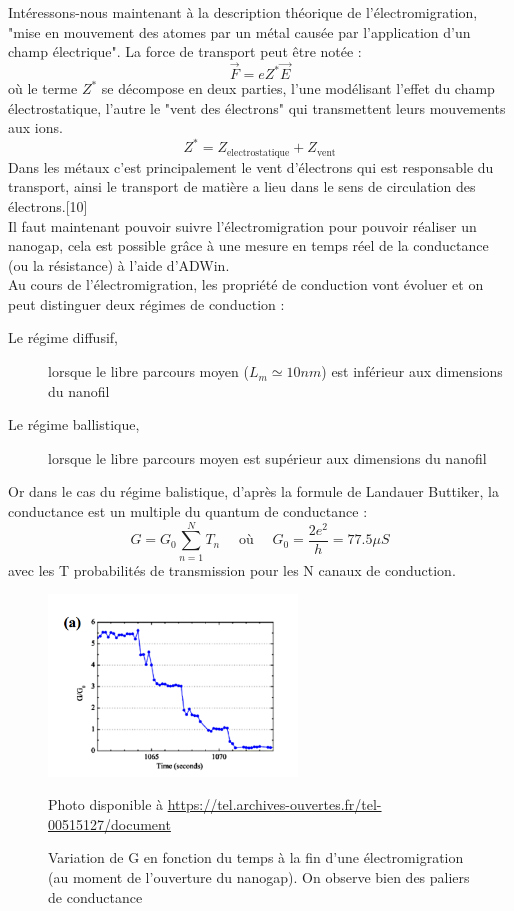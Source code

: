 Intéressons-nous maintenant à la description théorique de l'électromigration, "mise en mouvement des atomes par un métal causée par l'application d'un champ électrique". La force de transport peut être notée :
\[\vec{F}=e Z^* \vec{E}\]
où le terme $Z^*$ se décompose en deux parties, l'une modélisant l'effet du champ électrostatique, l'autre le "vent des électrons" qui transmettent leurs mouvements aux ions.
\[Z^* = Z_{\text{electrostatique}} + Z_{\text{vent}}\]
Dans les métaux c'est principalement le vent d'électrons qui est responsable du transport, ainsi le transport de matière a lieu dans le sens de circulation des électrons.[10]\\

Il faut maintenant pouvoir suivre l'électromigration pour pouvoir réaliser un nanogap, cela est possible grâce à une mesure en temps réel de la conductance (ou la résistance) à l'aide d'ADWin.\\

Au cours de l'électromigration, les propriété de conduction vont évoluer et on peut distinguer deux régimes de conduction :
\begin{description}
    \item[Le régime diffusif,] lorsque le libre parcours moyen ($L_m \simeq 10nm$) est inférieur aux dimensions du nanofil
    \item[Le régime ballistique,] lorsque le libre parcours moyen est supérieur aux dimensions du nanofil
\end{description}

Or dans le cas du régime balistique, d'après la formule de Landauer Buttiker, la conductance est un multiple du quantum de conductance :
\[G = G_0 \sum_{n=1}^N T_n \quad \text{ où } \quad G_0 = \frac{2e^2}{h} = 77.5 \mu S\]
avec les T probabilités de transmission pour les N canaux de conduction.
\begin{figure}[h]
    \begin{center}
        \includegraphics[width=250px]{Images/Electromigration_graphe}
        \caption{Variation de G en fonction du temps à la fin d’une électromigration (au moment de l’ouverture du nanogap).
On observe bien des paliers de conductance}
        Photo disponible à \url{https://tel.archives-ouvertes.fr/tel-00515127/document}
        \label{fig:}
    \end{center}
\end{figure}

